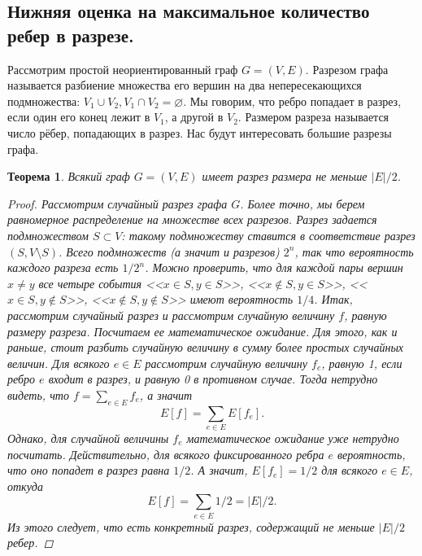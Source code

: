 \documentclass{article}
\newtheorem{theorem}{Теорема}
\begin{document}
\subsection{Нижняя оценка на максимальное количество ребер в разрезе.}
Рассмотрим простой неориентированный граф $G = (V,E)$. Разрезом графа называется разбиение множества его вершин на два непересекающихся подмножества: $V_1 \cup V_2, V_1 \cap V_2 = \varnothing$. Мы говорим, что ребро попадает в разрез, если один его конец лежит в $V_1$, а другой в $V_2$. Размером разреза называется число рёбер, попадающих в разрез. Нас будут интересовать большие разрезы графа.
\begin{theorem}
Всякий граф $G = (V, E)$ имеет разрез размера не меньше $|E|/2$.
\begin{proof}
Рассмотрим случайный разрез графа $G$. Более точно, мы берем равномерное распределение на множестве всех разрезов. Разрез задается подмножеством $S \subset V$: такому подмножеству ставится в соответствие разрез $(S, V \setminus S)$. Всего подмножеств (а значит и разрезов) $2^n$, так что вероятность каждого разреза есть $1/2^n$. Можно проверить, что для каждой пары вершин $x \neq y$ все четыре события <<$x \in S, y \in S$>>, <<$x \notin S, y \in S$>>, <<$x \in S, y \notin S$>>, <<$x \notin S, y \notin S$>> имеют вероятность $1/4$.
Итак, рассмотрим случайный разрез и рассмотрим случайную величину $f$, равную размеру разреза. Посчитаем ее математическое ожидание. Для этого, как и раньше, стоит разбить случайную величину в сумму более простых случайных величин. Для всякого $e \in E$ рассмотрим случайную величину $f_e$, равную 1, если ребро  $e$ входит в разрез, и равную 0 в противном случае. Тогда нетрудно видеть, что $f = \sum_{e \in E} f_e$, а значит
\[
E[f] = \sum_{e \in E} E[f_e].
\]
Однако, для случайной величины $f_e$ математическое ожидание уже нетрудно посчитать. Действительно, для всякого фиксированного ребра $e$ вероятность, что оно попадет в разрез равна $1/2$. А значит, $E[f_e] = 1/2$ для всякого $e \in E$, откуда
\[
E[f] = \sum_{e \in E} 1/2 = |E|/2.
\]
Из этого следует, что есть конкретный разрез, содержащий не меньше $|E|/2$ ребер.
\end{proof}
\end{theorem}
\end{document}
